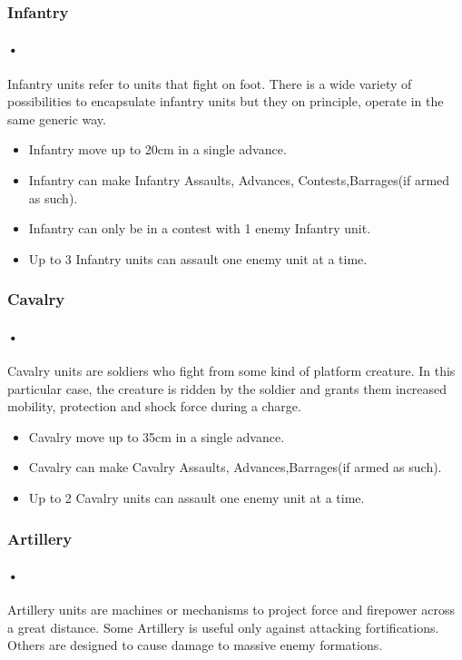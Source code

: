 \documentclass[12pt]{article}
\begin{document}
\subsubsection{Infantry}
\paragraph{•}
Infantry units refer to units that fight on foot. There is a wide variety of possibilities to encapsulate infantry units but they on principle, operate in the same generic way.

\begin{itemize}
\item Infantry move up to 20cm in a single advance.
\item Infantry can make Infantry Assaults, Advances, Contests,Barrages(if armed as such).
\item Infantry can only be in a contest with 1 enemy Infantry unit.
\item Up to 3 Infantry units can assault one enemy unit at a time.
\end{itemize}

\subsubsection{Cavalry}
\paragraph{•}
Cavalry units are soldiers who fight from some kind of platform creature. In this particular case, the creature is ridden by the soldier and grants them increased mobility, protection and shock force during a charge.
\begin{itemize}
\item Cavalry move up to 35cm in a single advance.
\item Cavalry can make Cavalry Assaults, Advances,Barrages(if armed as such).
\item Up to 2 Cavalry units can assault one enemy unit at a time.
\end{itemize}

\subsubsection{Artillery}
\paragraph{•}
Artillery units are machines or mechanisms to project force and firepower across a great distance. Some Artillery is useful only against attacking fortifications. Others are designed to cause damage to massive enemy formations.
\end{document}
